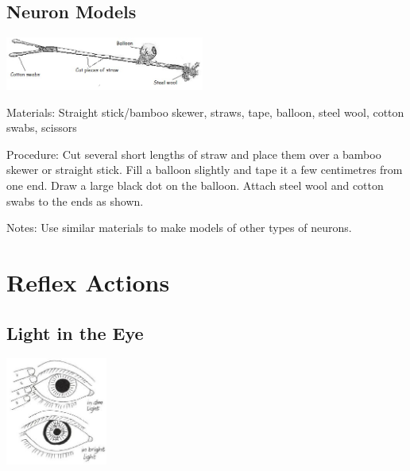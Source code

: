 \begin{multicols}{2}
\subsection{Neuron Models}

\begin{center}
\includegraphics[width=0.49\textwidth]{./img/neuron-model.jpg}
\end{center}

\begin{description*}
\item[Materials:]{Straight stick/bamboo skewer, straws, tape, balloon, steel wool, cotton swabs, scissors}
\item[Procedure:]{Cut several short lengths of straw and place them over a bamboo skewer or straight stick. Fill a balloon slightly and tape it a few centimetres from one end. Draw a large black dot on the balloon. Attach steel wool and cotton swabs to the ends as shown.}
\item[Notes:]{Use similar materials to make models of other types of neurons.}
\end{description*}


\section*{Reflex Actions}


\subsection{Light in the Eye}

\begin{center}
\includegraphics[width=0.25\textwidth]{./img/vso/light-eye.jpg}
\end{center}


\end{multicols}
